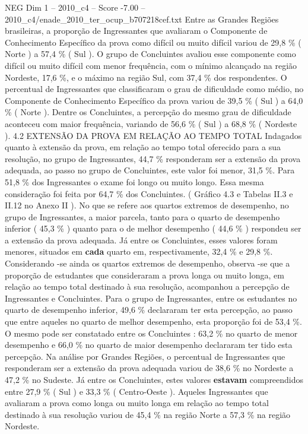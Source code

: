 \begin{textsample}{NEG Dim 1 – 2010\_c4 – Score -7.00 – 2010\_c4/enade\_2010\_ter\_ocup\_b707218cef.txt}
Entre as Grandes Regiões brasileiras, a proporção de Ingressantes que avaliaram o Componente de Conhecimento Específico da prova como difícil ou muito difícil variou de 29,8 \% ( Norte ) a 57,4 \% ( Sul ).
O grupo de Concluintes avaliou esse componente como difícil ou muito difícil com menor frequência, com o mínimo alcançado na região Nordeste, 17,6 \%, e o máximo na região Sul, com 37,4 \% dos respondentes.
O percentual de Ingressantes que classificaram o grau de dificuldade como médio, no Componente de Conhecimento Específico da prova variou de 39,5 \% ( Sul ) a 64,0 \% ( Norte ).
Dentre os Concluintes, a percepção do mesmo grau de dificuldade aconteceu com maior frequência, variando de 56,6 \% ( Sul ) a 68,8 \% ( Nordeste ). 4.2 EXTENSÃO DA PROVA EM RELAÇÃO AO TEMPO TOTAL Indagados quanto à extensão da prova, em relação ao tempo total oferecido para a sua resolução, no grupo de Ingressantes, 44,7 \% responderam ser a extensão da prova adequada, ao passo no grupo de Concluintes, este valor foi menor, 31,5 \%.
Para 51,8 \% dos Ingressantes o exame foi longo ou muito longo.
Essa mesma consideração foi feita por 64,7 \% dos Concluintes. ( Gráfico 4.3 e Tabelas II.3 e II.12 no Anexo II ).
No que se refere aos quartos extremos de desempenho, no grupo de Ingressantes, a maior parcela, tanto para o quarto de desempenho inferior ( 45,3 \% ) quanto para o de melhor desempenho ( 44,6 \% ) respondeu ser a extensão da prova adequada.
Já entre os Concluintes, esses valores foram menores, situados em \textbf{cada} quarto em, respectivamente, 32,4 \% e 29,8 \%.
Considerando -se ainda os quartos extremos de desempenho, observa -se que a proporção de estudantes que consideraram a prova longa ou muito longa, em relação ao tempo total destinado à sua resolução, acompanhou a percepção de Ingressantes e Concluintes.
Para o grupo de Ingressantes, entre os estudantes no quarto de desempenho inferior, 49,6 \% declararam ter esta percepção, ao passo que entre aqueles no quarto de melhor desempenho, esta proporção foi de 53,4 \%.
O mesmo pode ser constatado entre os Concluintes : 63,2 \% no quarto de menor desempenho e 66,0 \% no quarto de maior desempenho declararam ter tido esta percepção.
Na análise por Grandes Regiões, o percentual de Ingressantes que responderam ser a extensão da prova adequada variou de 38,6 \% no Nordeste a 47,2 \% no Sudeste.
Já entre os Concluintes, estes valores \textbf{estavam} compreendidos entre 27,9 \% ( Sul ) e 33,3 \% ( Centro-Oeste ).
Aqueles Ingressantes que avaliaram a prova como longa ou muito longa em relação ao tempo total destinado à sua resolução variou de 45,4 \% na região Norte a 57,3 \% na região Nordeste.

\end{textsample}

